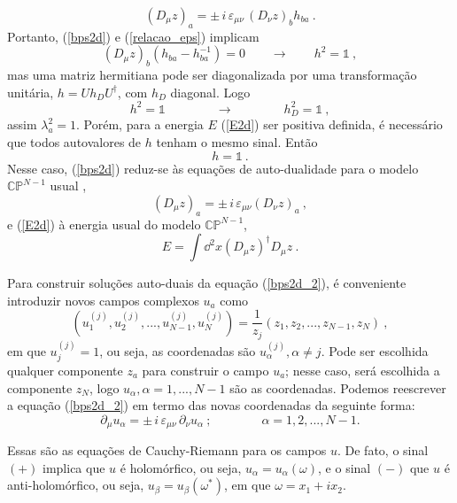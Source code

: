 \begin{equation}
    \left(D_\mu z\right)_a = \pm \, i \, \varepsilon_{\mu\nu} \, \left(D_\nu z\right)_b h_{ba} \ .
    \label{relacao_eps}
\end{equation}
Portanto, (\ref{bps2d}) e (\ref{relacao_eps}) implicam
\begin{equation}
    \left(D_\mu z \right)_b \left(h_{ba} - h^{-1}_{ba} \right) = 0 \qquad \rightarrow \qquad h^2 = \mathbb{1} \ ,
    \label{4.9}
\end{equation}
mas uma matriz hermitiana pode ser diagonalizada por uma transformação unitária, $h = Uh_DU^{\dag}$, com $h_D$ diagonal. Logo
\begin{equation}
    h^2 = \mathbb{1} \qquad \qquad \rightarrow \qquad\qquad h^2_D = \mathbb{1} \ ,
\end{equation}
assim $\lambda_a^2 = 1$. Porém, para a energia $E$ (\ref{E2d}) ser positiva definida, é necessário que todos autovalores de $h$ tenham o mesmo sinal. Então
\begin{equation}
    h = \mathbb{1} \ .
    \label{4.11}
\end{equation}
Nesse caso, (\ref{bps2d}) reduz-se às equações de auto-dualidade para o modelo $\mathbb{CP}^{N-1}$ usual \cite{sigmamodelinst, lowsigma},
\begin{equation}
    \left(D_\mu z\right)_a = \pm \, i \, \varepsilon_{\mu\nu} \left(D_\nu z\right )_a \ ,
    \label{bps2d_2}
\end{equation}
e (\ref{E2d}) à energia usual do modelo $\mathbb{CP}^{N-1}$,
\begin{equation}
    E = \int \dd^2x \left(D_\mu z \right)^{\dag} D_\mu z \ .
\end{equation}

Para construir soluções auto-duais da equação (\ref{bps2d_2}), é conveniente introduzir novos campos complexos $u_a$ como
\begin{equation}
    (u_1^{(j)}, u_2^{(j)}, ... , u_{N-1}^{(j)}, u_N^{(j)}) = \dfrac{1}{z_j}(z_1,z_2,...,z_{N-1},z_N) \ ,
\end{equation}
em que $u_j^{(j)} = 1$, ou seja, as coordenadas são $u_\alpha^{(j)}, \alpha\neq j$. Pode ser escolhida qualquer componente $z_a$ para construir o campo $u_a$; nesse caso, será escolhida a componente $z_N$, logo $u_\alpha , \alpha = 1,...,N-1$ são as coordenadas. Podemos reescrever a equação (\ref{bps2d_2}) em termo das novas coordenadas da seguinte forma: \cite{sigmamodelinst}
\begin{equation}
    \partial_\mu u_\alpha = \pm \, i \, \varepsilon_{\mu\nu} \, \partial_\nu u_\alpha \ ; \qquad \qquad \alpha = 1,2,...,N-1.
\end{equation}

Essas são as equações de Cauchy-Riemann para os campos $u$. De fato, o sinal $(+)$ implica que $u$ é holomórfico, ou seja, $u_\alpha = u_\alpha(\omega)$, e o sinal $(-)$ que $u$ é anti-holomórfico, ou seja, $u_\beta = u_\beta(\omega^*)$, em que $\omega = x_1 + i x_2$.